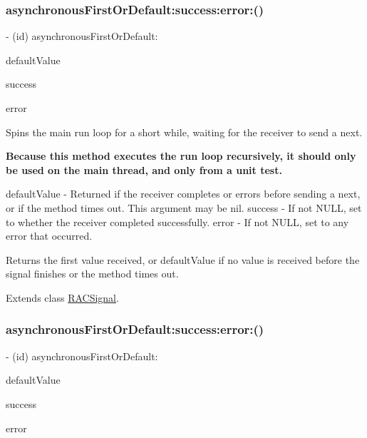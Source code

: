 \subsubsection{\texorpdfstring{asynchronous\+First\+Or\+Default\+:success\+:error\+:()}{asynchronousFirstOrDefault:success:error:()}\hspace{0.1cm}{\footnotesize\ttfamily [1/3]}}
{\footnotesize\ttfamily -\/ (id) asynchronous\+First\+Or\+Default\+: \begin{DoxyParamCaption}\item[{(id)}]{default\+Value }\item[{success:(B\+O\+OL $\ast$)}]{success }\item[{error:(N\+S\+Error $\ast$$\ast$)}]{error }\end{DoxyParamCaption}}

Spins the main run loop for a short while, waiting for the receiver to send a {\ttfamily next}.

{\bfseries Because this method executes the run loop recursively, it should only be used on the main thread, and only from a unit test.}

default\+Value -\/ Returned if the receiver completes or errors before sending a {\ttfamily next}, or if the method times out. This argument may be nil. success -\/ If not N\+U\+LL, set to whether the receiver completed successfully. error -\/ If not N\+U\+LL, set to any error that occurred.

Returns the first value received, or {\ttfamily default\+Value} if no value is received before the signal finishes or the method times out. 

Extends class \mbox{\hyperlink{interface_r_a_c_signal_a477114852c0e761a023a35e35ccc1784}{R\+A\+C\+Signal}}.

\mbox{\label{category_r_a_c_signal_07_testing_08_a477114852c0e761a023a35e35ccc1784}} 
\subsubsection{\texorpdfstring{asynchronous\+First\+Or\+Default\+:success\+:error\+:()}{asynchronousFirstOrDefault:success:error:()}\hspace{0.1cm}{\footnotesize\ttfamily [2/3]}}
{\footnotesize\ttfamily -\/ (id) asynchronous\+First\+Or\+Default\+: \begin{DoxyParamCaption}\item[{(id)}]{default\+Value }\item[{success:(B\+O\+OL $\ast$)}]{success }\item[{error:(N\+S\+Error $\ast$$\ast$)}]{error }\end{DoxyParamCaption}}

